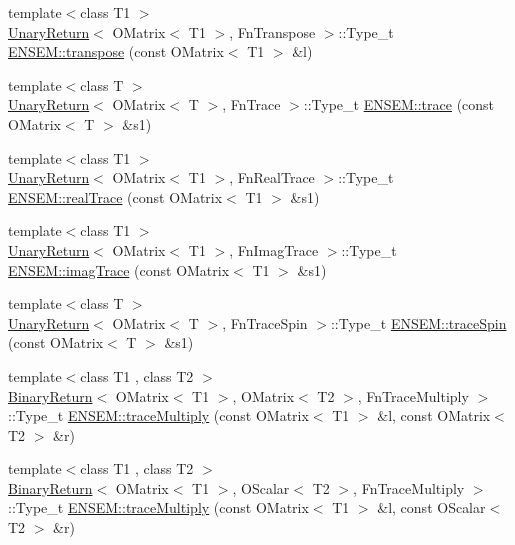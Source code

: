 \begin{DoxyCompactItemize}
\item 
{\footnotesize template$<$class T1 $>$ }\\\mbox{\hyperlink{structUnaryReturn}{Unary\+Return}}$<$ O\+Matrix$<$ T1 $>$, Fn\+Transpose $>$\+::Type\+\_\+t \mbox{\hyperlink{group__obsmatrix_gae3097e7f8ff8914a37a874367aed476b}{E\+N\+S\+E\+M\+::transpose}} (const O\+Matrix$<$ T1 $>$ \&l)
\item 
{\footnotesize template$<$class T $>$ }\\\mbox{\hyperlink{structUnaryReturn}{Unary\+Return}}$<$ O\+Matrix$<$ T $>$, Fn\+Trace $>$\+::Type\+\_\+t \mbox{\hyperlink{group__obsmatrix_gaff7b73c5978746f6706e0cd02f55cc40}{E\+N\+S\+E\+M\+::trace}} (const O\+Matrix$<$ T $>$ \&s1)
\item 
{\footnotesize template$<$class T1 $>$ }\\\mbox{\hyperlink{structUnaryReturn}{Unary\+Return}}$<$ O\+Matrix$<$ T1 $>$, Fn\+Real\+Trace $>$\+::Type\+\_\+t \mbox{\hyperlink{group__obsmatrix_gab3988428b88d3b56d2f959c536ec7d2a}{E\+N\+S\+E\+M\+::real\+Trace}} (const O\+Matrix$<$ T1 $>$ \&s1)
\item 
{\footnotesize template$<$class T1 $>$ }\\\mbox{\hyperlink{structUnaryReturn}{Unary\+Return}}$<$ O\+Matrix$<$ T1 $>$, Fn\+Imag\+Trace $>$\+::Type\+\_\+t \mbox{\hyperlink{group__obsmatrix_ga3c2758e95f41075ca3a027c6651a66aa}{E\+N\+S\+E\+M\+::imag\+Trace}} (const O\+Matrix$<$ T1 $>$ \&s1)
\item 
{\footnotesize template$<$class T $>$ }\\\mbox{\hyperlink{structUnaryReturn}{Unary\+Return}}$<$ O\+Matrix$<$ T $>$, Fn\+Trace\+Spin $>$\+::Type\+\_\+t \mbox{\hyperlink{group__obsmatrix_gae311225b718ade4433fe82a01a290d63}{E\+N\+S\+E\+M\+::trace\+Spin}} (const O\+Matrix$<$ T $>$ \&s1)
\item 
{\footnotesize template$<$class T1 , class T2 $>$ }\\\mbox{\hyperlink{structBinaryReturn}{Binary\+Return}}$<$ O\+Matrix$<$ T1 $>$, O\+Matrix$<$ T2 $>$, Fn\+Trace\+Multiply $>$\+::Type\+\_\+t \mbox{\hyperlink{group__obsmatrix_ga60f2f16fd8f3e889214584d3c0a90e92}{E\+N\+S\+E\+M\+::trace\+Multiply}} (const O\+Matrix$<$ T1 $>$ \&l, const O\+Matrix$<$ T2 $>$ \&r)
\item 
{\footnotesize template$<$class T1 , class T2 $>$ }\\\mbox{\hyperlink{structBinaryReturn}{Binary\+Return}}$<$ O\+Matrix$<$ T1 $>$, O\+Scalar$<$ T2 $>$, Fn\+Trace\+Multiply $>$\+::Type\+\_\+t \mbox{\hyperlink{group__obsmatrix_ga465cbe792dfb205b829f653853253e8f}{E\+N\+S\+E\+M\+::trace\+Multiply}} (const O\+Matrix$<$ T1 $>$ \&l, const O\+Scalar$<$ T2 $>$ \&r)

\end{DoxyCompactItemize}
